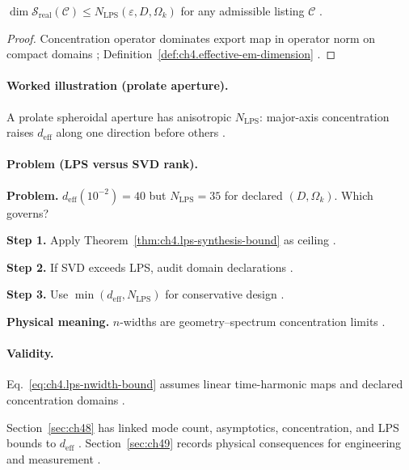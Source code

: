 \begin{theorem}
\label{thm:ch4.lps-synthesis-bound}
\(\dim\mathcal{S}_{\mathrm{real}}(\mathcal{C})\le N_{\mathrm{LPS}}(\varepsilon,D,\Omega_{k})\) for any admissible listing \(\mathcal{C}\)
\cite{stratton1941,hansen1988,harrington2001,devaney2004}.
\end{theorem}
\begin{proof}
Concentration operator dominates export map in operator norm on compact domains \cite{hansen1988}; Definition~\ref{def:ch4.effective-em-dimension}
\cite{harrington2001,stratton1941}.
\end{proof}

\paragraph{Worked illustration (prolate aperture).}
A prolate spheroidal aperture has anisotropic \(N_{\mathrm{LPS}}\): major-axis concentration raises \(d_{\mathrm{eff}}\) along one
direction before others \cite{hansen1988,jackson1999,harrington2001}.

\paragraph{Problem (LPS versus SVD rank).}
\textbf{Problem.} \(d_{\mathrm{eff}}(10^{-2})=40\) but \(N_{\mathrm{LPS}}=35\) for declared \((D,\Omega_{k})\). Which governs?

\textbf{Step 1.} Apply Theorem~\ref{thm:ch4.lps-synthesis-bound} as ceiling \cite{hansen1988,stratton1941}.

\textbf{Step 2.} If SVD exceeds LPS, audit domain declarations \cite{harrington2001,devaney2004}.

\textbf{Step 3.} Use \(\min(d_{\mathrm{eff}},N_{\mathrm{LPS}})\) for conservative design \cite{jackson1999}.

\textbf{Physical meaning.} \(n\)-widths are geometry--spectrum concentration limits \cite{hansen1988}.

\paragraph{Validity.}
Eq.~\eqref{eq:ch4.lps-nwidth-bound} assumes linear time-harmonic maps and declared concentration domains \cite{stratton1941,hansen1988}.

Section~\ref{sec:ch48} has linked mode count, asymptotics, concentration, and LPS bounds to \(d_{\mathrm{eff}}\)
\cite{stratton1941,hansen1988,harrington2001}. Section~\ref{sec:ch49} records physical consequences for engineering and measurement
\cite{devaney2004}.


